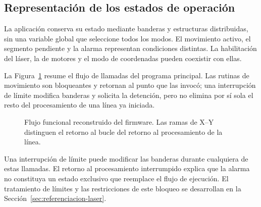 \documentclass[blue,fullpaper]{ludusofficial}  %
\begin{document}
\subsection{Representación de los estados de operación}
La aplicación conserva su estado mediante banderas y estructuras distribuidas, sin una variable global que seleccione todos los modos. El movimiento activo, el segmento pendiente y la alarma representan condiciones distintas. La habilitación del láser, la de motores y el modo de coordenadas pueden coexistir con ellas.

La Figura~\ref{fig:flujo-firmware} resume el flujo de llamadas del programa principal. Las rutinas de movimiento son bloqueantes y retornan al punto que las invocó; una interrupción de límite modifica banderas y solicita la detención, pero no elimina por sí sola el resto del procesamiento de una línea ya iniciada.

\begin{figure}[htbp]
\centering
{}
\caption{Flujo funcional reconstruido del firmware. Las ramas de X--Y distinguen el retorno al bucle del retorno al procesamiento de la línea.}
\label{fig:flujo-firmware}
\end{figure}

Una interrupción de límite puede modificar las banderas durante cualquiera de estas llamadas. El retorno al procesamiento interrumpido explica que la alarma no constituya un estado exclusivo que reemplace el flujo de ejecución. El tratamiento de límites y las restricciones de este bloqueo se desarrollan en la Sección~\ref{sec:referenciacion-laser}.
\end{document}
